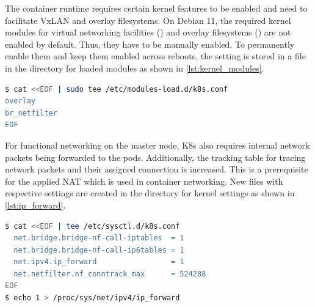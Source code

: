 The container runtime requires certain kernel features to be enabled and need to facilitate \ac{VxLAN} and overlay filesystems. On Debian 11, the required kernel modules for virtual networking facilities () and overlay filesystems () are not enabled by default. Thus, they have to be manually enabled.
To permanently enable them and keep them enabled across reboots, the setting is stored in a file in the directory for loaded modules as shown in \autoref{lst:kernel_modules}.

\begin{lstlisting}[label=lst:kernel_modules, caption={Bash commands for enabling required kernel modules\cite{Basappa.2022}. (\textit{/etc/modules-load.d/k8s.conf})}, language=bash]
$ cat <<EOF | sudo tee /etc/modules-load.d/k8s.conf 
overlay 
br_netfilter 
EOF 
\end{lstlisting}

For functional networking on the master node, \ac{K8s} also requires internal network packets being forwarded to the pods. Additionally, the tracking table for tracing network packets and their assigned connection is increased. This is a prerequisite for the applied \ac{NAT} which is used in container networking.
New files with respective settings are created in the directory for kernel settings as shown in \autoref{lst:ip_forward}.
\begin{lstlisting}[label=lst:ip_forward, caption={Bash commands for enabling \ac{IP} forwarding and network filtering.}, language=bash]
$ cat <<EOF | tee /etc/sysctl.d/k8s.conf 
  net.bridge.bridge-nf-call-iptables  = 1
  net.bridge.bridge-nf-call-ip6tables = 1
  net.ipv4.ip_forward                 = 1 
  net.netfilter.nf_conntrack_max      = 524288 
EOF
$ echo 1 > /proc/sys/net/ipv4/ip_forward
\end{lstlisting}

